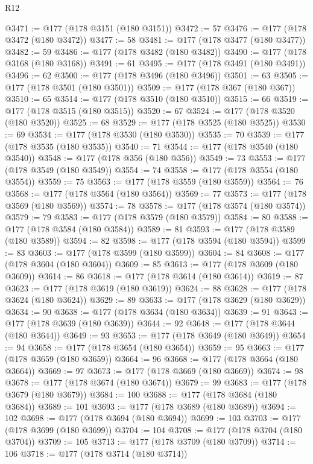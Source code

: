 \begin{lexlean}{R12}
\begin{coremodule}
@3471 := @177 (@178 @3151 (@180 @3151))
@3472 := 57
@3476 := @177 (@178 @3472 (@180 @3472))
@3477 := 58
@3481 := @177 (@178 @3477 (@180 @3477))
@3482 := 59
@3486 := @177 (@178 @3482 (@180 @3482))
@3490 := @177 (@178 @3168 (@180 @3168))
@3491 := 61
@3495 := @177 (@178 @3491 (@180 @3491))
@3496 := 62
@3500 := @177 (@178 @3496 (@180 @3496))
@3501 := 63
@3505 := @177 (@178 @3501 (@180 @3501))
@3509 := @177 (@178 @367 (@180 @367))
@3510 := 65
@3514 := @177 (@178 @3510 (@180 @3510))
@3515 := 66
@3519 := @177 (@178 @3515 (@180 @3515))
@3520 := 67
@3524 := @177 (@178 @3520 (@180 @3520))
@3525 := 68
@3529 := @177 (@178 @3525 (@180 @3525))
@3530 := 69
@3534 := @177 (@178 @3530 (@180 @3530))
@3535 := 70
@3539 := @177 (@178 @3535 (@180 @3535))
@3540 := 71
@3544 := @177 (@178 @3540 (@180 @3540))
@3548 := @177 (@178 @356 (@180 @356))
@3549 := 73
@3553 := @177 (@178 @3549 (@180 @3549))
@3554 := 74
@3558 := @177 (@178 @3554 (@180 @3554))
@3559 := 75
@3563 := @177 (@178 @3559 (@180 @3559))
@3564 := 76
@3568 := @177 (@178 @3564 (@180 @3564))
@3569 := 77
@3573 := @177 (@178 @3569 (@180 @3569))
@3574 := 78
@3578 := @177 (@178 @3574 (@180 @3574))
@3579 := 79
@3583 := @177 (@178 @3579 (@180 @3579))
@3584 := 80
@3588 := @177 (@178 @3584 (@180 @3584))
@3589 := 81
@3593 := @177 (@178 @3589 (@180 @3589))
@3594 := 82
@3598 := @177 (@178 @3594 (@180 @3594))
@3599 := 83
@3603 := @177 (@178 @3599 (@180 @3599))
@3604 := 84
@3608 := @177 (@178 @3604 (@180 @3604))
@3609 := 85
@3613 := @177 (@178 @3609 (@180 @3609))
@3614 := 86
@3618 := @177 (@178 @3614 (@180 @3614))
@3619 := 87
@3623 := @177 (@178 @3619 (@180 @3619))
@3624 := 88
@3628 := @177 (@178 @3624 (@180 @3624))
@3629 := 89
@3633 := @177 (@178 @3629 (@180 @3629))
@3634 := 90
@3638 := @177 (@178 @3634 (@180 @3634))
@3639 := 91
@3643 := @177 (@178 @3639 (@180 @3639))
@3644 := 92
@3648 := @177 (@178 @3644 (@180 @3644))
@3649 := 93
@3653 := @177 (@178 @3649 (@180 @3649))
@3654 := 94
@3658 := @177 (@178 @3654 (@180 @3654))
@3659 := 95
@3663 := @177 (@178 @3659 (@180 @3659))
@3664 := 96
@3668 := @177 (@178 @3664 (@180 @3664))
@3669 := 97
@3673 := @177 (@178 @3669 (@180 @3669))
@3674 := 98
@3678 := @177 (@178 @3674 (@180 @3674))
@3679 := 99
@3683 := @177 (@178 @3679 (@180 @3679))
@3684 := 100
@3688 := @177 (@178 @3684 (@180 @3684))
@3689 := 101
@3693 := @177 (@178 @3689 (@180 @3689))
@3694 := 102
@3698 := @177 (@178 @3694 (@180 @3694))
@3699 := 103
@3703 := @177 (@178 @3699 (@180 @3699))
@3704 := 104
@3708 := @177 (@178 @3704 (@180 @3704))
@3709 := 105
@3713 := @177 (@178 @3709 (@180 @3709))
@3714 := 106
@3718 := @177 (@178 @3714 (@180 @3714))

\end{coremodule}
\end{lexlean}

